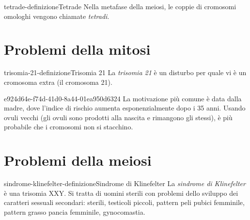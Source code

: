 \documentclass[preview]{standalone}
\begin{document}
\begin{snippetdefinition}{tetrade-definizione}{Tetrade}
    Nella metafase della meiosi, le coppie di cromosomi omologhi vengono chiamate
    \textit{tetradi}.
\end{snippetdefinition}




\section{Problemi della mitosi}

\begin{snippetdefinition}{trisomia-21-definizione}{Trisomia 21}
    La \textit{trisomia 21} è un disturbo per quale vi è un cromosoma extra (il cromosoma 21).
\end{snippetdefinition}


\begin{snippet}{e924d64e-f74d-41d0-8a44-01ea950d6324}
    La motivazione più comune è data dalla madre, dove l'indice di rischio aumenta
    esponenzialmente dopo i 35 anni.
    Usando ovuli vecchi (gli ovuli sono prodotti alla nascita e rimangono gli stessi),
    è più probabile che i cromosomi non si stacchino.
\end{snippet}

\section{Problemi della meiosi}


\begin{snippetdefinition}{sindrome-klinefelter-definizione}{Sindrome di Klinefelter}
    La \textit{sindrome di Klinefelter}
    è una trisomia XXY. Si tratta di uomini sterili con problemi dello sviluppo
    dei caratteri sessuali secondari:
    sterili, testicoli piccoli, pattern peli pubici femminile,
    pattern grasso pancia femminile, gynocomastia.
\end{snippetdefinition}
\end{document}
